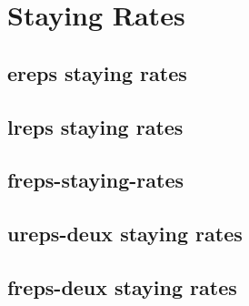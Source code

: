 \section{Staying Rates}
\label{sec:tables-srates}
\subsection{ereps staying rates}
\label{sub:tables-ereps-srates}

\subsection{lreps staying rates}
\label{sub:tables-lreps-srates}

\subsection{freps-staying-rates}
\label{sub:tables-freps-srates}

\subsection{ureps-deux staying rates}
\label{sub:tables-ureps-deux-srates}

\subsection{freps-deux staying rates}
\label{sub:tables-freps-deux-srates}
